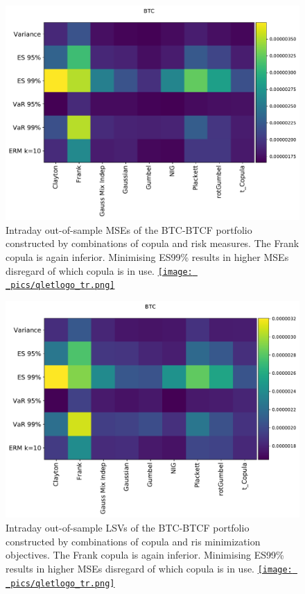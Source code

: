 \documentclass[11pt,a4paper,english]{article}
\begin{document}
\begin{figure}[t]
  \begin{center}
    \includegraphics[width=.65\textwidth]{_pics/intraday_BTC_MSEs.pdf}
  \end{center}
  \caption{Intraday out-of-sample MSEs of the BTC-BTCF portfolio constructed by combinations of copula and risk measures.
    The Frank copula is again inferior. Minimising ES99\% results in higher MSEs disregard of which copula is in use.
  \href{https://github.com/QuantLet/Hedging-Cryptos-with-Bitcoin-Futures/blob/main/newToQuantlet/Pynotebooks/figures/intraday/gen_MSEs_LSVs.ipynb}{\texttt{[image: \_pics/qletlogo\_tr.png]}}
}
\label{fig:BTC_MSE}
\end{figure}

\begin{figure}[t]
  \begin{center}
    \includegraphics[width=.65\textwidth]{_pics/intraday_BTC_LSVs.pdf}
  \end{center}
  \caption{Intraday out-of-sample LSVs of the BTC-BTCF portfolio constructed by combinations of copula and ris minimization objectives.
    The Frank copula is again inferior. Minimising ES99\% results in higher MSEs disregard of which copula is in use.
  \href{https://github.com/QuantLet/Hedging-Cryptos-with-Bitcoin-Futures/blob/main/newToQuantlet/Pynotebooks/figures/intraday/gen_MSEs_LSVs.ipynb}{\texttt{[image: \_pics/qletlogo\_tr.png]}} }
\label{fig:BTC_LSV}
\end{figure}
\end{document}
